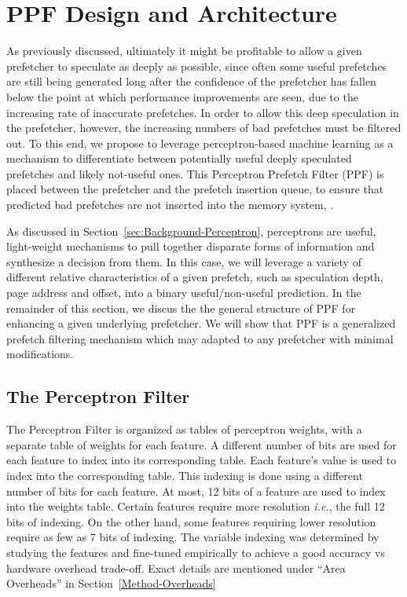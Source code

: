 \section{PPF Design and Architecture}
\label{Arch}

As previously discussed, ultimately it might be profitable to allow a
given prefetcher to speculate as deeply as possible, since often some
useful prefetches are still being generated long after the confidence
of the prefetcher has fallen below the point at which performance
improvements are seen, due to the increasing rate of inaccurate
prefetches.  In order to allow this deep speculation in the
prefetcher, however, the increasing numbers of bad prefetches must be
filtered out.  To this end, we propose to leverage perceptron-based
machine learning as a mechanism to differentiate between potentially
useful deeply speculated prefetches and likely not-useful ones.  This
Perceptron Prefetch Filter (PPF) is placed between the prefetcher and
the prefetch insertion queue, to ensure that predicted bad prefetches
are not inserted into the memory system, .

As discussed in Section~\ref{sec:Background-Perceptron}, perceptrons
are useful, light-weight mechanisms to pull together disparate forms
of information and synthesize a decision from them.  In this case, we
will leverage a variety of different relative characteristics of a
given prefetch, such as speculation depth, page address and offset,
into a binary useful/non-useful prediction.  In the remainder of this
section, we discus the the general structure of PPF for enhancing a
given underlying prefetcher.  We will show that PPF is a generalized
prefetch filtering mechanism which may adapted to any prefetcher with
minimal modifications. %

\subsection{The Perceptron Filter}
\label{Arch-Perceptron}


The Perceptron Filter is organized as tables of perceptron weights,
with a separate table of weights for each feature.  A different number
of bits are used for each feature to index into its corresponding
table.
Each feature's value is used to index into the corresponding table.
This indexing is done using a different number of bits for each
feature.  At most, 12 bits of a feature are used to index into the
weights table. Certain features require more resolution \textit{i.e.},
the full 12 bits of indexing.  On the other hand, some features
requiring lower resolution require as few as 7 bits of indexing.  The
variable indexing was determined by studying the features and
fine-tuned empirically to achieve a good accuracy vs hardware overhead
trade-off.  Exact details are mentioned under ``Area Overheads'' in
Section~\ref{Method-Overheads}

